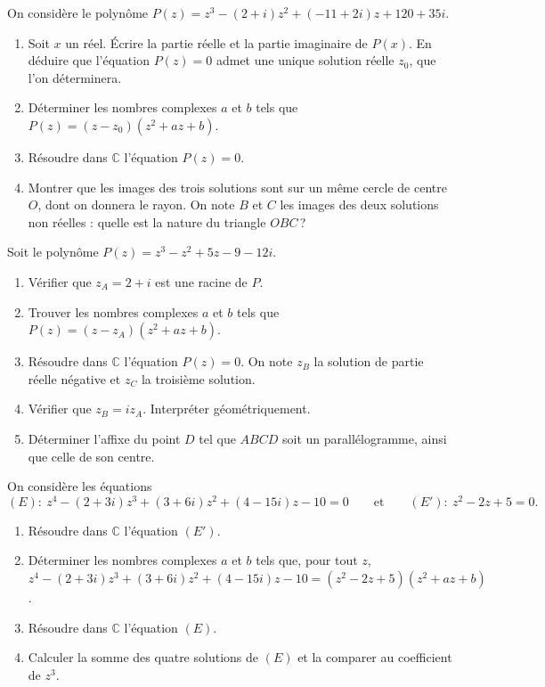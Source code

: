 %
\begin{exo}
	On consid\`ere le polyn\^ome $P(z) = z^3 - (2+i) z^2 + (-11 + 2i) z + 120 + 35i$.
	\begin{enumerate}
		\item Soit $x$ un r\'eel. \'Ecrire la partie r\'eelle et la partie imaginaire de $P(x)$.
		      En d\'eduire que l'\'equation $P(z) = 0$ admet une unique solution r\'eelle $z_0$, que l'on d\'eterminera.
		\item D\'eterminer les nombres complexes $a$ et $b$ tels que $P(z) = (z - z_0)(z^2 + a z + b)$.
		\item R\'esoudre dans $\mathbb{C}$ l'\'equation $P(z) = 0$.
		\item Montrer que les images des trois solutions sont sur un m\^eme cercle de centre $O$, dont on donnera le rayon.
		      On note $B$ et $C$ les images des deux solutions non r\'eelles : quelle est la nature du triangle $OBC$\,?
	\end{enumerate}
\end{exo}
%
\begin{exo}
	Soit le polyn\^ome $P(z) = z^3 - z^2 + 5z - 9 - 12i$.
	\begin{enumerate}
		\item V\'erifier que $z_A = 2 + i$ est une racine de $P$.
		\item Trouver les nombres complexes $a$ et $b$ tels que $P(z) = (z - z_A)(z^2 + a z + b)$.
		\item R\'esoudre dans $\mathbb{C}$ l'\'equation $P(z) = 0$.
		      On note $z_B$ la solution de partie r\'eelle n\'egative et $z_C$ la troisi\`eme solution.
		\item V\'erifier que $z_B = i z_A$. Interpr\'eter g\'eom\'etriquement.
		\item D\'eterminer l'affixe du point $D$ tel que $ABCD$ soit un parall\'elogramme, ainsi que celle de son centre.
	\end{enumerate}
\end{exo}
%
\begin{exo}
	On consid\`ere les \'equations
	\[
		(E) : \ z^4 - (2+3i) z^3 + (3+6i) z^2 + (4-15i) z - 10 = 0
		\qquad \text{et} \qquad
		(E') : \ z^2 - 2z + 5 = 0 .
	\]
	\begin{enumerate}
		\item R\'esoudre dans $\mathbb{C}$ l'\'equation $(E')$.
		\item D\'eterminer les nombres complexes $a$ et $b$ tels que, pour tout $z$,
		      $z^4 - (2+3i) z^3 + (3+6i) z^2 + (4-15i) z - 10 = (z^2 - 2z + 5)(z^2 + a z + b)$.
		\item R\'esoudre dans $\mathbb{C}$ l'\'equation $(E)$.
		\item Calculer la somme des quatre solutions de $(E)$ et la comparer au coefficient de $z^3$.
	\end{enumerate}
\end{exo}
